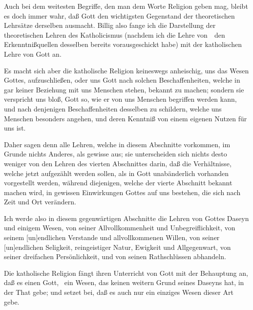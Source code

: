 \begin{aufza}
\item Auch bei dem weitesten Begriffe, den man dem Worte Religion geben mag, bleibt es doch immer wahr, daß Gott den wichtigsten Gegenstand der theoretischen Lehrsätze derselben ausmacht. Billig also fange ich die Darstellung der theoretischen Lehren des Katholicismus (nachdem ich die Lehre von~\ den Erkenntnißquellen desselben bereits vorausgeschickt habe) mit der katholischen Lehre von Gott an.
\item Es macht sich aber die katholische Religion keineswegs anheischig, uns das Wesen Gottes,  aufzuschließen, oder uns Gott nach solchen Beschaffenheiten, welche in gar keiner Beziehung mit uns Menschen stehen, bekannt zu machen; sondern sie verspricht uns bloß, Gott so, wie er von uns Menschen begriffen werden kann, und nach denjenigen Beschaffenheiten desselben zu schildern, welche uns Menschen besonders angehen, und deren Kenntniß von einem eigenen Nutzen für uns ist.
\item Daher sagen denn alle Lehren, welche in diesem Abschnitte vorkommen, im Grunde nichts Anderes, als gewisse  aus; sie unterscheiden sich nichts desto weniger von den Lehren des vierten Abschnittes darin, daß die Verhältnisse, welche jetzt aufgezählt werden sollen, als in Gott unabänderlich vorhanden vorgestellt werden, während diejenigen, welche der vierte Abschnitt bekannt machen wird, in gewissen Einwirkungen Gottes auf uns bestehen, die sich nach Zeit und Ort verändern.
\item Ich werde also in diesem gegenwärtigen Abschnitte die Lehren von Gottes Daseyn und einigem Wesen, von seiner Allvollkommenheit und Unbegreiflichkeit, von seinem [un]endlichen Verstande und allvollkommenen Willen, von seiner [un]endlichen Seligkeit, reingeistiger Natur, Ewigkeit und Allgegenwart, von seiner dreifachen Persönlichkeit, und von seinen Rathschlüssen abhandeln.
\end{aufza}

Die katholische Religion fängt ihren Unterricht von Gott mit der Behauptung an, daß es einen Gott, \dh\ ein Wesen, das keinen weitern Grund seines Daseyns hat, in der That gebe; und setzet bei, daß es auch nur ein einziges Wesen dieser Art gebe.~

